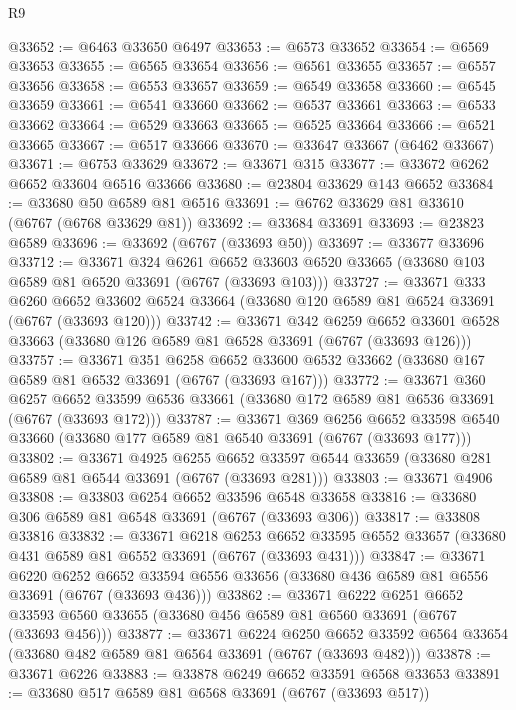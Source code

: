 \begin{lexlean}{R9}
\begin{coremodule}
@33652 := @6463 @33650 @6497
@33653 := @6573 @33652
@33654 := @6569 @33653
@33655 := @6565 @33654
@33656 := @6561 @33655
@33657 := @6557 @33656
@33658 := @6553 @33657
@33659 := @6549 @33658
@33660 := @6545 @33659
@33661 := @6541 @33660
@33662 := @6537 @33661
@33663 := @6533 @33662
@33664 := @6529 @33663
@33665 := @6525 @33664
@33666 := @6521 @33665
@33667 := @6517 @33666
@33670 := @33647 @33667 (@6462 @33667)
@33671 := @6753 @33629
@33672 := @33671 @315
@33677 := @33672 @6262 @6652 @33604 @6516 @33666
@33680 := @23804 @33629 @143 @6652
@33684 := @33680 @50 @6589 @81 @6516
@33691 := @6762 @33629 @81 @33610 (@6767 (@6768 @33629 @81))
@33692 := @33684 @33691
@33693 := @23823 @6589
@33696 := @33692 (@6767 (@33693 @50))
@33697 := @33677 @33696
@33712 := @33671
    @324
    @6261
    @6652
    @33603
    @6520
    @33665
    (@33680 @103 @6589 @81 @6520 @33691 (@6767 (@33693 @103)))
@33727 := @33671
    @333
    @6260
    @6652
    @33602
    @6524
    @33664
    (@33680 @120 @6589 @81 @6524 @33691 (@6767 (@33693 @120)))
@33742 := @33671
    @342
    @6259
    @6652
    @33601
    @6528
    @33663
    (@33680 @126 @6589 @81 @6528 @33691 (@6767 (@33693 @126)))
@33757 := @33671
    @351
    @6258
    @6652
    @33600
    @6532
    @33662
    (@33680 @167 @6589 @81 @6532 @33691 (@6767 (@33693 @167)))
@33772 := @33671
    @360
    @6257
    @6652
    @33599
    @6536
    @33661
    (@33680 @172 @6589 @81 @6536 @33691 (@6767 (@33693 @172)))
@33787 := @33671
    @369
    @6256
    @6652
    @33598
    @6540
    @33660
    (@33680 @177 @6589 @81 @6540 @33691 (@6767 (@33693 @177)))
@33802 := @33671
    @4925
    @6255
    @6652
    @33597
    @6544
    @33659
    (@33680 @281 @6589 @81 @6544 @33691 (@6767 (@33693 @281)))
@33803 := @33671 @4906
@33808 := @33803 @6254 @6652 @33596 @6548 @33658
@33816 := @33680 @306 @6589 @81 @6548 @33691 (@6767 (@33693 @306))
@33817 := @33808 @33816
@33832 := @33671
    @6218
    @6253
    @6652
    @33595
    @6552
    @33657
    (@33680 @431 @6589 @81 @6552 @33691 (@6767 (@33693 @431)))
@33847 := @33671
    @6220
    @6252
    @6652
    @33594
    @6556
    @33656
    (@33680 @436 @6589 @81 @6556 @33691 (@6767 (@33693 @436)))
@33862 := @33671
    @6222
    @6251
    @6652
    @33593
    @6560
    @33655
    (@33680 @456 @6589 @81 @6560 @33691 (@6767 (@33693 @456)))
@33877 := @33671
    @6224
    @6250
    @6652
    @33592
    @6564
    @33654
    (@33680 @482 @6589 @81 @6564 @33691 (@6767 (@33693 @482)))
@33878 := @33671 @6226
@33883 := @33878 @6249 @6652 @33591 @6568 @33653
@33891 := @33680 @517 @6589 @81 @6568 @33691 (@6767 (@33693 @517))

\end{coremodule}
\end{lexlean}
